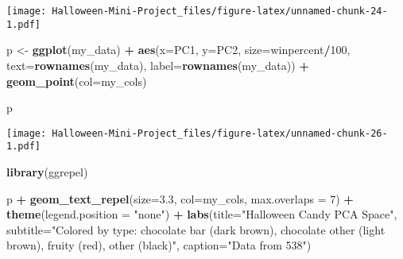 \documentclass[
]{article}
\newenvironment{Shaded}{\begin{snugshade}}{\end{snugshade}}
\newcommand{\AttributeTok}[1]{\textcolor[rgb]{0.13,0.29,0.53}{#1}}
\newcommand{\CommentTok}[1]{\textcolor[rgb]{0.56,0.35,0.01}{\textit{#1}}}
\newcommand{\DecValTok}[1]{\textcolor[rgb]{0.00,0.00,0.81}{#1}}
\newcommand{\FloatTok}[1]{\textcolor[rgb]{0.00,0.00,0.81}{#1}}
\newcommand{\FunctionTok}[1]{\textcolor[rgb]{0.13,0.29,0.53}{\textbf{#1}}}
\newcommand{\NormalTok}[1]{#1}
\newcommand{\OtherTok}[1]{\textcolor[rgb]{0.56,0.35,0.01}{#1}}
\newcommand{\SpecialCharTok}[1]{\textcolor[rgb]{0.81,0.36,0.00}{\textbf{#1}}}
\newcommand{\StringTok}[1]{\textcolor[rgb]{0.31,0.60,0.02}{#1}}
\begin{document}
\begin{Shaded}
\end{Shaded}

\texttt{[image: Halloween-Mini-Project\_files/figure-latex/unnamed-chunk-24-1.pdf]}

\begin{Shaded}
\end{Shaded}

\begin{Shaded}
\begin{Highlighting}[]
\NormalTok{p }\OtherTok{\textless{}{-}} \FunctionTok{ggplot}\NormalTok{(my\_data) }\SpecialCharTok{+} 
        \FunctionTok{aes}\NormalTok{(}\AttributeTok{x=}\NormalTok{PC1, }\AttributeTok{y=}\NormalTok{PC2, }
            \AttributeTok{size=}\NormalTok{winpercent}\SpecialCharTok{/}\DecValTok{100}\NormalTok{,  }
            \AttributeTok{text=}\FunctionTok{rownames}\NormalTok{(my\_data),}
            \AttributeTok{label=}\FunctionTok{rownames}\NormalTok{(my\_data)) }\SpecialCharTok{+}
        \FunctionTok{geom\_point}\NormalTok{(}\AttributeTok{col=}\NormalTok{my\_cols)}

\NormalTok{p}
\end{Highlighting}
\end{Shaded}

\texttt{[image: Halloween-Mini-Project\_files/figure-latex/unnamed-chunk-26-1.pdf]}

\begin{Shaded}
\begin{Highlighting}[]
\FunctionTok{library}\NormalTok{(ggrepel)}

\NormalTok{p }\SpecialCharTok{+} \FunctionTok{geom\_text\_repel}\NormalTok{(}\AttributeTok{size=}\FloatTok{3.3}\NormalTok{, }\AttributeTok{col=}\NormalTok{my\_cols, }\AttributeTok{max.overlaps =} \DecValTok{7}\NormalTok{)  }\SpecialCharTok{+} 
  \FunctionTok{theme}\NormalTok{(}\AttributeTok{legend.position =} \StringTok{"none"}\NormalTok{) }\SpecialCharTok{+}
  \FunctionTok{labs}\NormalTok{(}\AttributeTok{title=}\StringTok{"Halloween Candy PCA Space"}\NormalTok{,}
       \AttributeTok{subtitle=}\StringTok{"Colored by type: chocolate bar (dark brown), chocolate other (light brown), fruity (red), other (black)"}\NormalTok{,}
       \AttributeTok{caption=}\StringTok{"Data from 538"}\NormalTok{)}
\end{Highlighting}
\end{Shaded}
\end{document}
